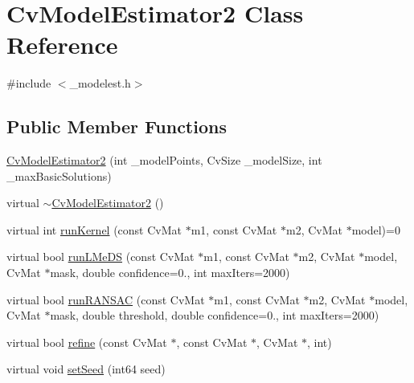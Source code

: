 \hypertarget{class_cv_model_estimator2}{}\section{Cv\+Model\+Estimator2 Class Reference}
\label{class_cv_model_estimator2}


{\ttfamily \#include $<$\+\_\+modelest.\+h$>$}

\subsection*{Public Member Functions}
\begin{DoxyCompactItemize}
\item 
\hyperlink{class_cv_model_estimator2_a91cf072d79537808e705a9fa31867da3}{Cv\+Model\+Estimator2} (int \+\_\+model\+Points, Cv\+Size \+\_\+model\+Size, int \+\_\+max\+Basic\+Solutions)
\item 
virtual \hyperlink{class_cv_model_estimator2_a656e12f072058449ca45d785c0eaa02a}{$\sim$\+Cv\+Model\+Estimator2} ()
\item 
virtual int \hyperlink{class_cv_model_estimator2_ac8c9c1586d3334f468d4152c67554adc}{run\+Kernel} (const Cv\+Mat $\ast$m1, const Cv\+Mat $\ast$m2, Cv\+Mat $\ast$model)=0
\item 
virtual bool \hyperlink{class_cv_model_estimator2_a15486b3aea44ad7247924dd1532ce5a8}{run\+L\+Me\+DS} (const Cv\+Mat $\ast$m1, const Cv\+Mat $\ast$m2, Cv\+Mat $\ast$model, Cv\+Mat $\ast$mask, double confidence=0., int max\+Iters=2000)
\item 
virtual bool \hyperlink{class_cv_model_estimator2_af44a8168c5416e210819c7eea380ac66}{run\+R\+A\+N\+S\+AC} (const Cv\+Mat $\ast$m1, const Cv\+Mat $\ast$m2, Cv\+Mat $\ast$model, Cv\+Mat $\ast$mask, double threshold, double confidence=0., int max\+Iters=2000)
\item 
virtual bool \hyperlink{class_cv_model_estimator2_a760edefe34027333ccc6c19e74cb46d1}{refine} (const Cv\+Mat $\ast$, const Cv\+Mat $\ast$, Cv\+Mat $\ast$, int)
\item 
virtual void \hyperlink{class_cv_model_estimator2_a4946fc6c99f37e5dae1f68e78e85110d}{set\+Seed} (int64 seed)
\end{DoxyCompactItemize}
